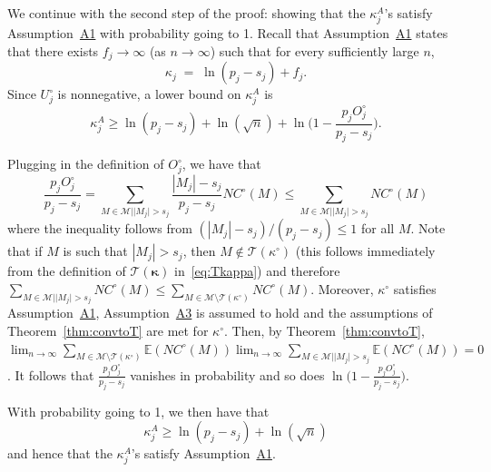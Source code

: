 \documentclass[
  12pt]{article}
\newcommand{\E}{\mathbb{E}}
\newcommand{\M}{\mathcal{M}}
\newcommand{\T}{\mathcal{T}}
\newcommand{\bkappa}{\boldsymbol{\kappa}}
\begin{document}
We continue with the second step of the proof: showing that the $\kappa^{A}_j$'s satisfy Assumption~\hyperlink{lab:A1}{A1} with probability going to 1. Recall that Assumption~\hyperlink{lab:A1}{A1} states that there exists $f_j\to \infty$ (as $n\to \infty$) such that for every sufficiently large $n$,
\begin{equation*}
    \kappa_j \;=\;\ln(p_j-s_j) + f_j.
\end{equation*}
Since $U_j^{\circ}$ is nonnegative, a lower bound on $\kappa^{A}_j$ is
\begin{equation}\label{eq:decompstep2pen2}
    \kappa^{A}_j
    \geq  \ln(p_j-s_j)+\ln(\sqrt{n})+\ln\Big(1-\frac{p_j O^{\circ}_j}{p_j-s_j}\Big).
\end{equation}

Plugging in the definition of $O^{\circ}_j$, we have that
$$\frac{p_j O^{\circ}_j}{p_j-s_j} =  \sum_{M \in \M | |M_j| > s_j}\frac{|M_j|-s_j}{p_j-s_j}NC^{\circ}(M)\leq \sum_{M \in \M | |M_j| > s_j}NC^{\circ}(M)$$
where the inequality follows from $(|M_j|-s_j)/(p_j-s_j)\leq 1$ for all $M$.
Note that if $M$ is such that $|M_j|>s_j$, then $M\not\in\T(\kappa^{\circ})$ (this follows immediately from the definition of $\T(\bkappa)$ in~\eqref{eq:Tkappa}) and therefore $\sum_{M \in \M | |M_j| > s_j}NC^{\circ}(M)\leq \sum_{M \in \M \setminus \T(\kappa^{\circ})}NC^{\circ}(M)$. Moreover, $\kappa^{\circ}$ satisfies Assumption~\hyperlink{lab:A1}{A1}, Assumption~\hyperlink{lab:A3}{A3} is assumed to hold and the assumptions of Theorem~\ref{thm:convtoT} are met for $\kappa^{\circ}$.
Then, by Theorem~\ref{thm:convtoT}, $\lim_{n\to\infty} \sum_{M \in \M \setminus \T(\kappa^{\circ})}\E(NC^{\circ}(M))\lim_{n\to\infty}\sum_{M \in \M | |M_j| > s_j}\E(NC^{\circ}(M)) = 0$. It follows that $\frac{p_j O^{\circ}_j}{p_j-s_j}$ vanishes in probability and so does $\ln\Big(1-\frac{p_j O^{\circ}_j}{p_j-s_j}\Big)$.

With probability going to 1, we then have that
\begin{equation}\label{eq:finallowerboundkappaj2}\kappa^{A}_j 
    \geq  \ln(p_j-s_j)+\ln(\sqrt{n})
\end{equation}
and hence that the $\kappa^{A}_j$'s satisfy Assumption~\hyperlink{lab:A1}{A1}.
\end{document}
